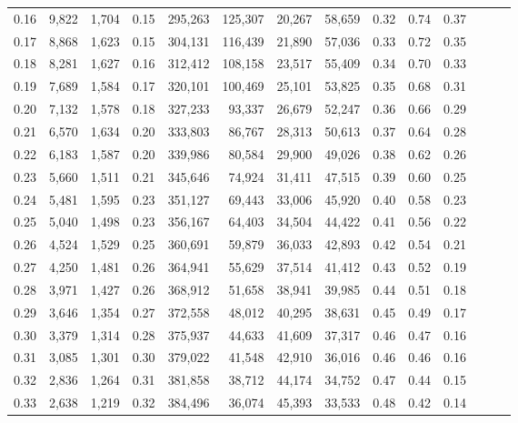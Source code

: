 \begin{tabular}{rrrrrrrrrrrrrr}
0.16 &   9,822 &  1,704 &  0.15 &  295,263 &  125,307 &  20,267 &  58,659 &  0.32 &  0.74 &      0.37 \\
0.17 &   8,868 &  1,623 &  0.15 &  304,131 &  116,439 &  21,890 &  57,036 &  0.33 &  0.72 &      0.35 \\
0.18 &   8,281 &  1,627 &  0.16 &  312,412 &  108,158 &  23,517 &  55,409 &  0.34 &  0.70 &      0.33 \\
0.19 &   7,689 &  1,584 &  0.17 &  320,101 &  100,469 &  25,101 &  53,825 &  0.35 &  0.68 &      0.31 \\
0.20 &   7,132 &  1,578 &  0.18 &  327,233 &   93,337 &  26,679 &  52,247 &  0.36 &  0.66 &      0.29 \\
0.21 &   6,570 &  1,634 &  0.20 &  333,803 &   86,767 &  28,313 &  50,613 &  0.37 &  0.64 &      0.28 \\
0.22 &   6,183 &  1,587 &  0.20 &  339,986 &   80,584 &  29,900 &  49,026 &  0.38 &  0.62 &      0.26 \\
0.23 &   5,660 &  1,511 &  0.21 &  345,646 &   74,924 &  31,411 &  47,515 &  0.39 &  0.60 &      0.25 \\
0.24 &   5,481 &  1,595 &  0.23 &  351,127 &   69,443 &  33,006 &  45,920 &  0.40 &  0.58 &      0.23 \\
0.25 &   5,040 &  1,498 &  0.23 &  356,167 &   64,403 &  34,504 &  44,422 &  0.41 &  0.56 &      0.22 \\
0.26 &   4,524 &  1,529 &  0.25 &  360,691 &   59,879 &  36,033 &  42,893 &  0.42 &  0.54 &      0.21 \\
0.27 &   4,250 &  1,481 &  0.26 &  364,941 &   55,629 &  37,514 &  41,412 &  0.43 &  0.52 &      0.19 \\
0.28 &   3,971 &  1,427 &  0.26 &  368,912 &   51,658 &  38,941 &  39,985 &  0.44 &  0.51 &      0.18 \\
0.29 &   3,646 &  1,354 &  0.27 &  372,558 &   48,012 &  40,295 &  38,631 &  0.45 &  0.49 &      0.17 \\
0.30 &   3,379 &  1,314 &  0.28 &  375,937 &   44,633 &  41,609 &  37,317 &  0.46 &  0.47 &      0.16 \\
0.31 &   3,085 &  1,301 &  0.30 &  379,022 &   41,548 &  42,910 &  36,016 &  0.46 &  0.46 &      0.16 \\
0.32 &   2,836 &  1,264 &  0.31 &  381,858 &   38,712 &  44,174 &  34,752 &  0.47 &  0.44 &      0.15 \\
0.33 &   2,638 &  1,219 &  0.32 &  384,496 &   36,074 &  45,393 &  33,533 &  0.48 &  0.42 &      0.14 \\

\end{tabular}
